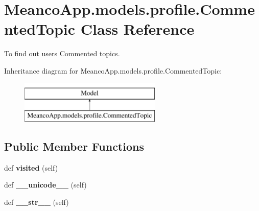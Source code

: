 \hypertarget{class_meanco_app_1_1models_1_1profile_1_1_commented_topic}{}\section{Meanco\+App.\+models.\+profile.\+Commented\+Topic Class Reference}
\label{class_meanco_app_1_1models_1_1profile_1_1_commented_topic}


To find out users Commented topics.  


Inheritance diagram for Meanco\+App.\+models.\+profile.\+Commented\+Topic\+:\begin{figure}[H]
\begin{center}
\leavevmode
\includegraphics[height=2.000000cm]{class_meanco_app_1_1models_1_1profile_1_1_commented_topic}
\end{center}
\end{figure}
\subsection*{Public Member Functions}
\begin{DoxyCompactItemize}
\item 
\hypertarget{class_meanco_app_1_1models_1_1profile_1_1_commented_topic_a5b301a5803b77b2a5c1574ec1deb9703}{}\label{class_meanco_app_1_1models_1_1profile_1_1_commented_topic_a5b301a5803b77b2a5c1574ec1deb9703} 
def {\bfseries visited} (self)
\item 
\hypertarget{class_meanco_app_1_1models_1_1profile_1_1_commented_topic_aa41cfa31ae94973eee68792efb0ca0e4}{}\label{class_meanco_app_1_1models_1_1profile_1_1_commented_topic_aa41cfa31ae94973eee68792efb0ca0e4} 
def {\bfseries \+\_\+\+\_\+unicode\+\_\+\+\_\+} (self)
\item 
\hypertarget{class_meanco_app_1_1models_1_1profile_1_1_commented_topic_a0629c56954fd970c94fe7e44455c0323}{}\label{class_meanco_app_1_1models_1_1profile_1_1_commented_topic_a0629c56954fd970c94fe7e44455c0323} 
def {\bfseries \+\_\+\+\_\+str\+\_\+\+\_\+} (self)
\end{DoxyCompactItemize}
